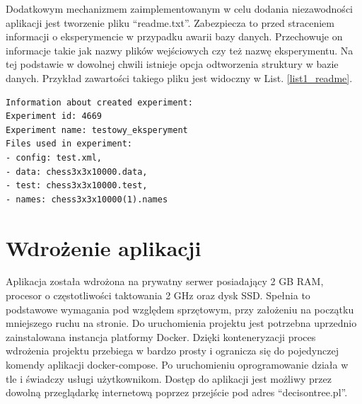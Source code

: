Dodatkowym mechanizmem zaimplementowanym w celu dodania niezawodności aplikacji jest tworzenie pliku \enquote{readme.txt}. Zabezpiecza to przed straceniem informacji o eksperymencie w przypadku awarii bazy danych. Przechowuje on informacje takie jak nazwy plików wejściowych czy też nazwę eksperymentu. Na tej podstawie w dowolnej chwili istnieje opcja odtworzenia struktury w bazie danych. Przykład zawartości takiego pliku jest widoczny w List. \ref{list1_readme}.

\begin{lstlisting}[numbers=none,frame=single, caption={Przykład zawartości pliku readme },captionpos=b, label=list1_readme]
Information about created experiment: 
Experiment id: 4669
Experiment name: testowy_eksperyment
Files used in experiment: 
- config: test.xml,
- data: chess3x3x10000.data, 
- test: chess3x3x10000.test, 
- names: chess3x3x10000(1).names
\end{lstlisting}


\section{Wdrożenie aplikacji}
Aplikacja została wdrożona na prywatny serwer posiadający 2 GB RAM, procesor o częstotliwości taktowania 2 GHz oraz dysk SSD. Spełnia to podstawowe wymagania pod względem sprzętowym, przy założeniu na początku mniejszego ruchu na stronie. Do uruchomienia projektu jest potrzebna uprzednio zainstalowana instancja platformy Docker. Dzięki konteneryzacji proces wdrożenia projektu przebiega w bardzo prosty i ogranicza się do pojedynczej komendy aplikacji docker-compose. Po uruchomieniu oprogramowanie działa w tle i świadczy usługi użytkownikom. Dostęp do aplikacji jest możliwy przez dowolną przeglądarkę internetową poprzez przejście pod adres \enquote{decisontree.pl}. 
